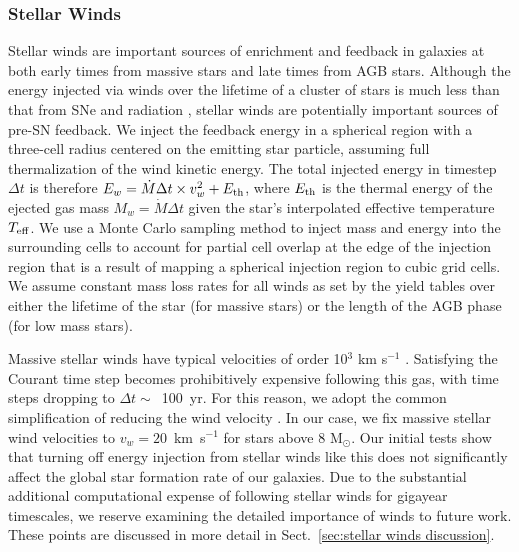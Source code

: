 \documentclass[twocolumn]{aastex61}
\begin{document}
\subsubsection{Stellar Winds}
\label{sec:stellar winds}
Stellar winds are important sources of enrichment and feedback in galaxies at both early times from massive stars and late times from AGB stars. Although the energy injected via winds over the lifetime of a cluster of stars is much less than that from SNe and radiation \citep{Shull1995}, stellar winds are potentially important sources of pre-SN feedback. We inject the feedback energy in a spherical region with a three-cell radius centered on the emitting star particle, assuming full thermalization of the wind kinetic energy. The total injected energy in timestep $\Delta t$ is therefore $E_w = \dot{M}\Delta t \times v^2_w + E_{\rm th}$, where $E_{\rm th}$ is the thermal energy of the ejected gas mass $M_w = \dot{M}\Delta t$ given the star's interpolated effective temperature $T_{\rm eff}$. We use a Monte Carlo sampling method to inject mass and energy into the surrounding cells to account for partial cell overlap at the edge of the injection region that is a result of mapping a spherical injection region to cubic grid cells. We assume constant mass loss rates for all winds as set by the yield tables over either the lifetime of the star (for massive stars) or the length of the AGB phase (for low mass stars). 

Massive stellar winds have typical velocities of order 10$^{3}$ km s$^{-1}$ \citep{Leitherer1992}. Satisfying the Courant time step becomes prohibitively expensive following this gas, with time steps dropping to $\Delta t \sim$~100~yr. For this reason, we adopt the common simplification of reducing the wind velocity \citep[e.g][]{Offner2015}. In our case, we fix massive stellar wind velocities to $v_w = 20$~km~s$^{-1}$ for stars above 8 M$_{\odot}$. Our initial tests show that turning off energy injection from stellar winds like this does not significantly affect the global star formation rate of our galaxies. Due to the substantial additional computational expense of following stellar winds for gigayear timescales, we reserve examining the detailed importance of winds to future work. These points are discussed in more detail in Sect.~\ref{sec:stellar winds discussion}.
\end{document}
